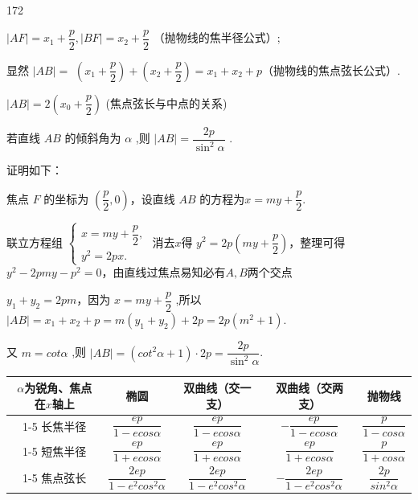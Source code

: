 \begin{dingautolist}{172}
    \item $\left| {AF}\right|  = {x}_{1} + \dfrac{p}{2},\left| {BF}\right|  = {x}_{2} + \dfrac{p}{2}$ （抛物线的焦半径公式）; 
    
    显然 $\left| {AB}\right|  =$  $\left( {{x}_{1} + \dfrac{p}{2}}\right)  + \left( {{x}_{2} + \dfrac{p}{2}}\right)  = {x}_{1} + {x}_{2} + p$（抛物线的焦点弦长公式）.
    \item $\left| {AB}\right|  = 2\left( {{x}_{0} + \dfrac{p}{2}}\right)$ (焦点弦长与中点的关系)

    \item 若直线 ${AB}$ 的倾斜角为 $\alpha$ ,则 $\left| {AB}\right|  = \dfrac{2p}{{\sin }^{2}\alpha }$ .

    证明如下：
    
    焦点 $F$ 的坐标为 $\left( {\dfrac{p}{2},0}\right)$，设直线 ${AB}$ 的方程为$x = my+\dfrac{p}{2}$.
    
    联立方程组 $\left\{  \begin{array}{l} 
        x = my+\dfrac{p}{2}, \\  
        {y}^{2} = {2px}. \end{array}\right.$ 
    消去$x$得 ${y}^{2} = 2p\left(my+\dfrac{p}{2}\right)$，整理可得$y^2 - 2pmy - p^2 = 0$，由直线过焦点易知必有$A, B$两个交点
    
    ${y}_{1} + {y}_{2} = 2pm$，因为 $x = my + \dfrac{p}{2}$ ,所以$\left| {AB}\right|  = {x}_{1} + {x}_{2} + p = m(y_1+y_2) + {2p} = 2p(m^2+1)$.
    
    又 $m = cot \alpha$ ,则 $\left| {AB}\right|  = \left( cot^{2}\alpha  + 1\right)  \cdot  {2p} = \dfrac{2p}{{\sin }^{2}\alpha }$.

    \begin{center}
    \begin{tabular}{|c|c|c|c|c|}
    \hline
    {$\alpha$为锐角、焦点在$x$轴上} & 椭圆 & 双曲线（交一支） &  双曲线（交两支）& 抛物线 \\
    \cline{1-5}
    长焦半径 & $\dfrac{ep}{1-ecos\alpha}$ & $\dfrac{ep}{1-ecos\alpha}$ & $-\dfrac{ep}{1-ecos\alpha}$ & $\dfrac{p}{1-cos\alpha}$ \\    
    \cline{1-5}
    短焦半径 & $\dfrac{ep}{1+ecos\alpha}$ & $\dfrac{ep}{1+ecos\alpha}$ & $\dfrac{ep}{1+ecos\alpha}$ & $\dfrac{p}{1+cos\alpha}$ \\
    \cline{1-5}
    焦点弦长 & $\dfrac{2ep}{1-e^2cos^2\alpha}$ & $\dfrac{2ep}{1-e^2cos^2\alpha}$ & $-\dfrac{2ep}{1-e^2cos^2\alpha}$ & $\dfrac{2p}{sin^2\alpha}$ \\
    \hline
    \end{tabular}
    \end{center}


\end{dingautolist}
